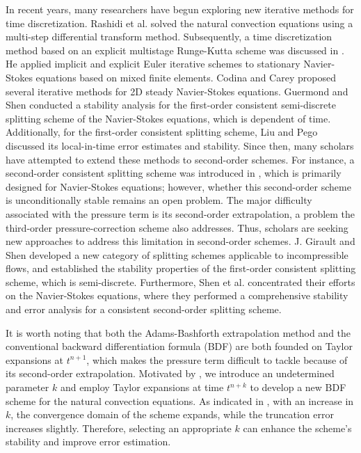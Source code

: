 \documentclass[10pt]{article}
\begin{document}
	In recent years, many researchers have begun exploring new iterative methods for time discretization. Rashidi et al. \cite{Rashidi2013} solved the natural convection equations using a multi-step differential transform method. Subsequently, a time discretization method based on an explicit multistage Runge-Kutta scheme was discussed in \cite{Y1999}. He \cite{H2013} applied implicit and explicit Euler iterative schemes to stationary Navier-Stokes equations based on mixed finite elements. Codina \cite{Codina} and Carey \cite{Carey} proposed several iterative methods for 2D steady Navier-Stokes equations.  Guermond and Shen \cite{Gu2003}  conducted a stability analysis for the first-order consistent semi-discrete splitting scheme of the Navier-Stokes equations, which is dependent of time. Additionally, for the first-order consistent splitting scheme, Liu and Pego \cite{J2007,Liu2010} discussed its local-in-time error estimates and stability. Since then, many scholars have attempted to extend these methods to second-order schemes. For instance, a second-order consistent splitting scheme  was introduced in \cite{H2004}, which is primarily designed for Navier-Stokes equations; however, whether this second-order scheme is unconditionally stable remains an open problem. The major difficulty associated with the pressure term is its second-order extrapolation, a problem the third-order pressure-correction scheme also addresses\cite{J1993}. Thus, scholars are seeking new approaches to address this limitation in second-order schemes. J. Girault and Shen \cite{J2003} developed a new category of splitting schemes applicable to incompressible flows, and established the stability properties of the  first-order consistent splitting scheme, which is semi-discrete. Furthermore, Shen et al. \cite{Shen2023} concentrated their efforts on the Navier-Stokes equations, where they performed a comprehensive stability and error analysis for a consistent second-order splitting scheme. 
	
	It is worth noting that both the Adams-Bashforth extrapolation method and the conventional backward differentiation formula (BDF) are both founded on Taylor expansions at  \( t^{n+1} \), which makes the pressure term difficult to tackle because of its second-order extrapolation. Motivated by \cite{Shen2023}, we introduce an undetermined parameter \( k \) and employ Taylor expansions at time \( t^{n+k} \) to develop a new BDF scheme for the natural convection equations. As indicated in \cite{Shen2023}, with an increase in \( k \), the convergence domain of the scheme expands, while the truncation error increases slightly. Therefore, selecting an appropriate \( k \) can enhance the scheme’s stability and improve error estimation.  
	
\end{document}
